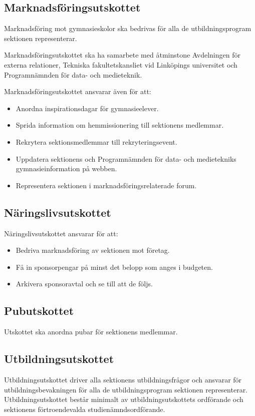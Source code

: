 \documentclass{datateknologsektionen-document}
\begin{document}
\subsection{Marknadsföringsutskottet}
Marknadsföring mot gymnasieskolor ska bedrivas för alla de utbildningsprogram sektionen representerar.

Marknadsföringsutskottet ska ha samarbete med åtminstone Avdelningen för externa relationer,
Tekniska fakultetskansliet vid Linköpings universitet och Programnämnden för data- och medieteknik.

Marknadsföringsutskottet ansvarar även för att:
\begin{itemize}
  \item Anordna inspirationsdagar för gymnasieelever.
  \item Sprida information om hemmissionering till sektionens medlemmar.
  \item Rekrytera sektionsmedlemmar till rekryteringsevent.
  \item Uppdatera sektionens och Programnämnden för data- och medietekniks gymnasieinformation på webben.
  \item Representera sektionen i marknadsföringsrelaterade forum.
\end{itemize}

\subsection{Näringslivsutskottet}
Näringslivsutskottet ansvarar för att:
\begin{itemize}
  \item Bedriva marknadsföring av sektionen mot företag.
  \item Få in sponsorpengar på minst det belopp som anges i budgeten.
  \item Arkivera sponsoravtal och se till att de följs.
\end{itemize}

\subsection{Pubutskottet}
Utskottet ska anordna pubar för sektionens medlemmar.

\subsection{Utbildningsutskottet}
Utbildningsutskottet driver alla sektionens utbildningsfrågor och ansvarar för
utbildningsbevakningen för alla de utbildningsprogram sektionen representerar.
Utbildningsutskottet består minimalt av utbildningsutskottets ordförande och
sektionens förtroendevalda studienämndsordförande.
\end{document}
